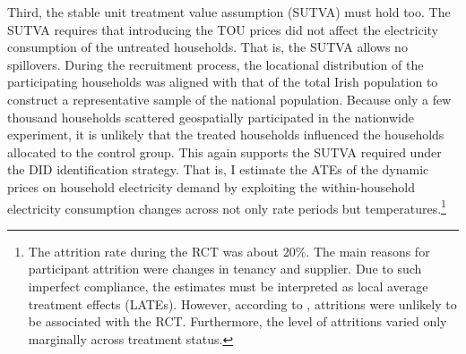 {Third, the stable unit treatment value assumption (SUTVA) must hold too. The SUTVA requires that introducing the TOU prices did not affect the electricity consumption of the untreated households. That is, the SUTVA allows no spillovers. During the recruitment process, the locational distribution of the participating households was aligned with that of the total Irish population to construct a representative sample of the national population. Because only a few thousand households scattered geospatially participated in the nationwide experiment, it is unlikely that the treated households influenced the households allocated to the control group. This again supports the SUTVA required under the DID identification strategy.} That is, I estimate the ATEs of the dynamic prices on household electricity demand by exploiting the within-household electricity consumption changes across not only rate periods but temperatures.\footnote{The attrition rate during the RCT was about 20\%. The main reasons for participant attrition were changes in tenancy and supplier. Due to such imperfect compliance, the estimates must be interpreted as local average treatment effects (LATEs). However, according to \cite{Electricity-Smart-Metering-Customer-Behaviour-Trials-Findings-Report_CER_2011}, attritions were unlikely to be associated with the RCT. Furthermore, the level of attritions varied only marginally across treatment status.}
